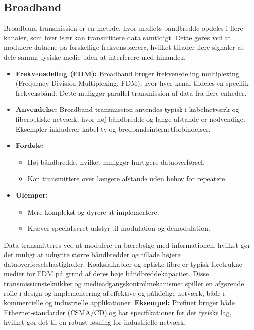 \subsection{Broadband}
Broadband transmission er en metode, hvor mediets båndbredde opdeles i flere kanaler, som hver især kan transmittere data samtidigt. Dette gøres ved at modulere dataene på forskellige frekvensbærere, hvilket tillader flere signaler at dele samme fysiske medie uden at interferere med hinanden.
\begin{itemize}
	\item \textbf{Frekvensdeling (FDM):} Broadband bruger frekvensdeling multiplexing (Frequency Division Multiplexing, FDM), hvor hver kanal tildeles en specifik frekvensbånd. Dette muliggør parallel transmission af data fra flere enheder.
	\item \textbf{Anvendelse:} Broadband transmission anvendes typisk i kabelnetværk og fiberoptiske netværk, hvor høj båndbredde og lange afstande er nødvendige. Eksempler inkluderer kabel-tv og bredbåndsinternetforbindelser.
	\item \textbf{Fordele:}
	\begin{itemize}
		\item Høj båndbredde, hvilket muliggør hurtigere dataoverførsel.
		\item Kan transmittere over længere afstande uden behov for repeatere.
	\end{itemize}
	\item \textbf{Ulemper:}
	\begin{itemize}
		\item Mere komplekst og dyrere at implementere.
		\item Kræver specialiseret udstyr til modulation og demodulation.
	\end{itemize}
\end{itemize}
Data transmitteres ved at modulere en bærebølge med informationen, hvilket gør det muligt at udnytte større båndbredder og tillade højere dataoverførselshastigheder. Koaksialkabler og optiske fibre er typisk foretrukne medier for FDM på grund af deres høje båndbreddekapacitet.
\newline
\newline
\noindent Disse transmissionsteknikker og medieadgangskontrolmekanismer spiller en afgørende rolle i design og implementering af effektive og pålidelige netværk, både i kommercielle og industrielle applikationer. 
\newline
\newline
\noindent\textbf{Eksempel:} Profinet bruger både Ethernet-standarder (CSMA/CD) og har specifikationer for det fysiske lag, hvilket gør det til en robust løsning for industrielle netværk.

